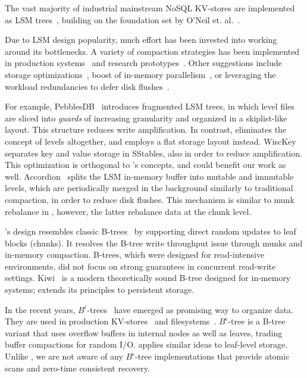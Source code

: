 

The vast majority of industrial mainstream NoSQL KV-stores are  implemented as LSM trees~\cite{hbase, 
RocksDB, scylladb, Bigtable2008, cassandra2010}, building on the foundation set by O'Neil 
et. al.~\cite{O'Neil1996, Muth1998}. 

Due to LSM design popularity, much effort has been invested into working around its bottlenecks.
A variety of compaction strategies has been implemented in production systems~\cite{CallaghanCompaction, 
ScyllaCompaction} and research prototypes~\cite{triad, PebblesDB}. Other suggestions include storage
optimizations~\cite{WiscKey, PebblesDB}, boost of in-memory parallelism~\cite{scylladb, clsm2015}, or leveraging 
the workload redundancies to defer disk flushes~\cite{triad, accordion}. 

For example, PebblesDB~\cite{PebblesDB} introduces fragmented LSM trees, in which level files are 
sliced into {\em guards\/} of increasing granularity and organized in a skiplist-like layout. This structure 
reduces write amplification. In contrast, \sys\/ eliminates the concept of levels altogether, 
and employs a flat storage layout instead. WiscKey~\cite{WiscKey} separates key and value storage 
in SStables, also in order to reduce amplification. This optimization is orthogonal to \sys's concepts,
and could benefit our work as well. Accordion~\cite{accordion} splits the LSM in-memory buffer into mutable 
and immutable levels, which are periodically merged in the background similarly to traditional compaction, 
in order to reduce disk flushes. This mechanism is similar to munk rebalance in \sys, 
however, the latter rebalance data at the chunk level.

\sys's design resembles classic B-trees~\cite{Knuth:1998:ACP:280635} by supporting direct random updates to leaf blocks (chunks). 
It resolves the B-tree write throughput issue through munks and in-memory compaction. B-trees, which were 
designed for read-intensive environments, did not focus on strong guarantees in concurrent  read-write settings. 
Kiwi~\cite{kiwi} is a modern theoretically sound B-tree designed for in-memory systems; \sys\/ extends its principles
to persistent storage. 

In the recent years, $B^{\epsilon}$-trees~\cite{Brodal:2003:LBE:644108.644201} have emerged 
as promising way to organize data. They are used in production KV-stores~\cite{TokuDB} and filesystems~\cite{BetrFS}. 
$B^{\epsilon}$-tree is a B-tree variant that uses overflow buffers in internal nodes as well as leaves, trading buffer 
compactions for random I/O. \sys\/ applies similar ideas to leaf-level storage.  Unlike \sys, we are not aware of any 
$B^{\epsilon}$-tree implementations that provide atomic scans and zero-time consistent recovery. 

